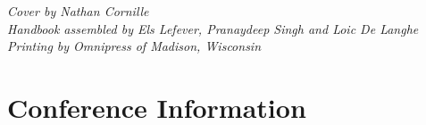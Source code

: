 \documentclass[twoside,makeidx]{book}
\begin{document}


\fancyfoot[C]{}





\cleardoublepage
\thispagestyle{empty}
\emph{Cover by Nathan Cornille}\\
    \emph{Handbook assembled by Els Lefever, Pranaydeep Singh and Loic De Langhe}\\
\emph{Printing by Omnipress of Madison, Wisconsin}\\

\newpage
\cleardoublepage
\fancyfoot[C]{\thepage}
\frontmatter





\setcounter{tocdepth}{2}
\tableofcontents
\mainmatter
\pagestyle{fancy}



\chapter{Conference Information}


\clearpage


\clearpage%
\setheaders{}{}


%
\clearpage%
\setheaders{}{}

%
\end{document}
